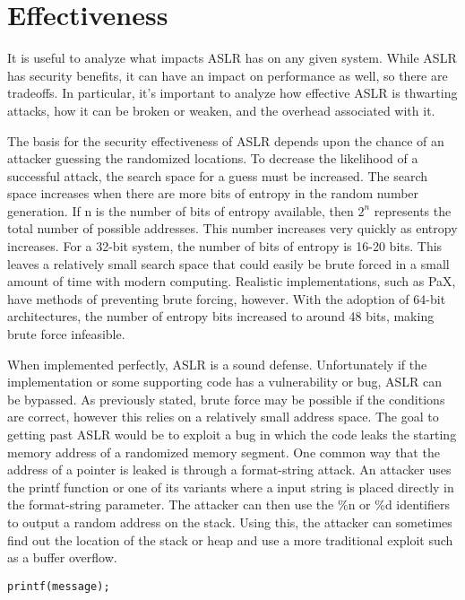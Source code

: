 \section{Effectiveness}
\label{s:effectiveness} %

It is useful to analyze what impacts ASLR has on any given system. While ASLR has security benefits, it can have an impact on performance as well, so there are tradeoffs. In particular, it’s important to analyze how effective ASLR is thwarting attacks, how it can be broken or weaken, and the overhead associated with it.

The basis for the security effectiveness of ASLR depends upon the chance of an attacker guessing the randomized locations. To decrease the likelihood of a successful attack, the search space for a guess must be increased. The search space increases when there are more bits of entropy in the random number generation. If n is the number of bits of entropy available, then $2^n$ represents the total number of possible addresses. This number increases very quickly as entropy increases. For a 32-bit system, the number of bits of entropy is 16-20 bits. This leaves a relatively small search space that could easily be brute forced in a small amount of time with modern computing. Realistic implementations, such as PaX, have methods of preventing brute forcing, however. With the adoption of 64-bit architectures, the number of entropy bits increased to around 48 bits, making brute force infeasible.

When implemented perfectly, ASLR is a sound defense. Unfortunately if the implementation or some supporting code has a vulnerability or bug, ASLR can be bypassed. As previously stated, brute force may be possible if the conditions are correct, however this relies on a relatively small address space. The goal to getting past ASLR would be to exploit a bug in which the code leaks the starting memory address of a randomized memory segment. One common way that the address of a pointer is leaked is through a format-string attack. \cite{bhatkar2003address} An attacker uses the printf function or one of its variants where a input string is placed directly in the format-string parameter. The attacker can then use the \%n or \%d identifiers to output a random address on the stack. Using this, the attacker can sometimes find out the location of the stack or heap and use a more traditional exploit such as a buffer overflow.

\begin{lstlisting}[caption=Figure 3. A dangerous printf statement]
printf(message);
\end{lstlisting}

